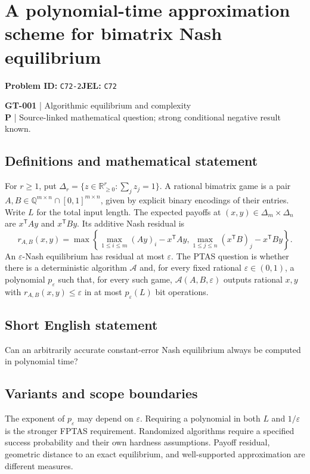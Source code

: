 \documentclass[11pt,a4paper]{article}
\begin{document}
\section*{A polynomial-time approximation scheme for bimatrix Nash equilibrium}
\textbf{Problem ID:} \texttt{C72-2}\quad \textbf{JEL:} \texttt{C72}\par
\label{problem:OP-0131}
\label{game:GT-001}
{\sffamily\small\color{muted}
\textbf{GT-001} | Algorithmic equilibrium and complexity\\
\textbf{P} | Source-linked mathematical question; strong conditional negative result known.
\par}
\subsection*{Definitions and mathematical statement}
For $r\geq1$, put $\Delta_r=\{z\in\mathbb R_{\geq0}^{r}:\sum_jz_j=1\}$. A rational bimatrix game is a pair $A,B\in\mathbb Q^{m\times n}\cap[0,1]^{m\times n}$, given by explicit binary encodings of their entries. Write $L$ for the total input length. The expected payoffs at $(x,y)\in\Delta_m\times\Delta_n$ are $x^{\mathsf T}Ay$ and $x^{\mathsf T}By$. Its additive Nash residual is
\[
 r_{A,B}(x,y)=\max\left\{\max_{1\leq i\leq m}(Ay)_i-x^{\mathsf T}Ay,
 \max_{1\leq j\leq n}(x^{\mathsf T}B)_j-x^{\mathsf T}By\right\}.
\]
An $\varepsilon$-Nash equilibrium has residual at most $\varepsilon$. The PTAS question is whether there is a deterministic algorithm $\mathcal A$ and, for every fixed rational $\varepsilon\in(0,1)$, a polynomial $p_\varepsilon$ such that, for every such game, $\mathcal A(A,B,\varepsilon)$ outputs rational $x,y$ with $r_{A,B}(x,y)\leq\varepsilon$ in at most $p_\varepsilon(L)$ bit operations.
\subsection*{Short English statement}
Can an arbitrarily accurate constant-error Nash equilibrium always be computed in polynomial time?
\subsection*{Variants and scope boundaries}
The exponent of $p_\varepsilon$ may depend on $\varepsilon$. Requiring a polynomial in both $L$ and $1/\varepsilon$ is the stronger FPTAS requirement. Randomized algorithms require a specified success probability and their own hardness assumptions. Payoff residual, geometric distance to an exact equilibrium, and well-supported approximation are different measures.
\end{document}
